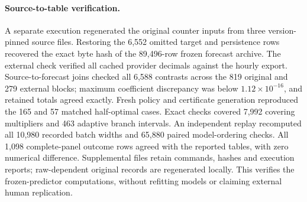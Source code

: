 \paragraph{Source-to-table verification.}
A separate execution regenerated the original counter inputs from three
version-pinned source files. Restoring the 6,552 omitted target and persistence
rows recovered the exact byte hash of the 89,496-row frozen forecast archive.
The external check verified all cached provider decimals against the hourly
export. Source-to-forecast joins checked all 6,588 contrasts across the
819 original and 279 external blocks; maximum coefficient discrepancy was below
$1.12\times10^{-16}$, and retained totals agreed exactly.
Fresh policy and certificate generation reproduced the 165 and 57 matched
half-optimal cases. Exact checks covered 7,992 covering multipliers and
463 adaptive branch intervals. An independent replay recomputed all 10,980
recorded batch widths and 65,880 paired model-ordering checks. All 1,098
complete-panel outcome rows agreed with the reported tables, with zero
numerical difference. Supplemental files retain commands, hashes and
execution reports; raw-dependent original records are regenerated locally.
This verifies the frozen-predictor computations, without refitting models
or claiming external human replication.
